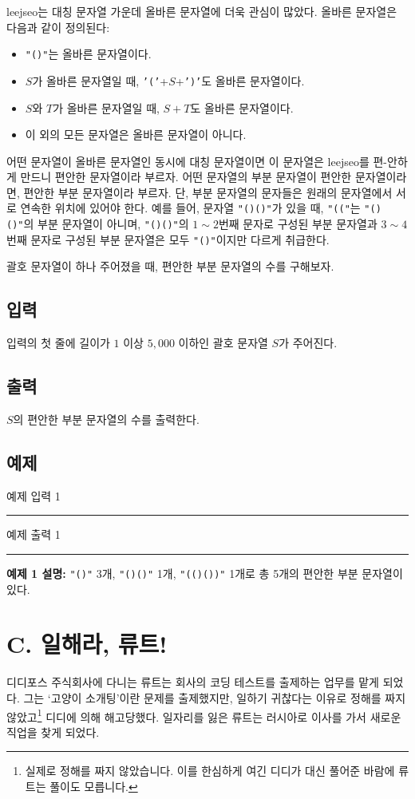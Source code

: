 \documentclass{article}
\def\inputdataname{예제 입력 } %
\def\outputdataname{예제 출력 } %
\newcommand{\iodataNo}[2]{%
	\begin{minipage}{\textwidth}
		\begin{multicols}{2}
			{\inputdataname#2} \\
			\rule{\columnwidth}{1pt}
			
			\columnbreak
			{\outputdataname#2} \\
			\rule{\columnwidth}{1pt}
			
		\end{multicols}
		\vspace{\baselineskip}
	\end{minipage}

}
\begin{document}
leejseo는 대칭 문자열 가운데 올바른 문자열에 더욱 관심이 많았다. 올바른 문자열은 다음과 같이 정의된다:
\begin{itemize}
	\item \texttt{"()"}는 올바른 문자열이다.
	\item $S$가 올바른 문자열일 때, \texttt{'('}+$S$+\texttt{')'}도 올바른 문자열이다.
	\item $S$와 $T$가 올바른 문자열일 때, $S+T$도 올바른 문자열이다.
	\item 이 외의 모든 문자열은 올바른 문자열이 아니다.
\end{itemize}

어떤 문자열이 올바른 문자열인 동시에 대칭 문자열이면 이 문자열은 leejseo를 편-안하게 만드니 편안한 문자열이라 부르자. 어떤 문자열의 부분 문자열이 편안한 문자열이라면, 편안한 부분 문자열이라 부르자. 단, 부분 문자열의 문자들은 원래의 문자열에서 서로 연속한 위치에 있어야 한다. 예를 들어, 문자열 \texttt{"()()"}가 있을 때, \texttt{"(("}는 \texttt{"()()"}의 부분 문자열이 아니며, \texttt{"()()"}의 $1\sim2$번째 문자로 구성된 부분 문자열과 $3\sim4$번째 문자로 구성된 부분 문자열은 모두 \texttt{"()"}이지만 다르게 취급한다.\newline

괄호 문자열이 하나 주어졌을 때, 편안한 부분 문자열의 수를 구해보자.

\subsection{입력}
입력의 첫 줄에 길이가 $1$ 이상 $5,000$ 이하인 괄호 문자열 $S$가 주어진다.

\subsection{출력}
$S$의 편안한 부분 문자열의 수를 출력한다.

\subsection{예제}
\iodataNo{par1}{1}

\textbf{예제 1 설명:} \texttt{"()"} 3개, \texttt{"()()"} 1개, \texttt{"(()())"} 1개로 총 5개의 편안한 부분 문자열이 있다. \newline

\newpage

\section{C. 일해라, 류트!}
디디포스 주식회사에 다니는 류트는 회사의 코딩 테스트를 출제하는 업무를 맡게 되었다. 그는 `고양이 소개팅'이란 문제를 출제했지만, 일하기 귀찮다는 이유로 정해를 짜지 않았고\footnote{실제로 정해를 짜지 않았습니다. 이를 한심하게 여긴 디디가 대신 풀어준 바람에 류트는 풀이도 모릅니다.} 디디에 의해 해고당했다. 일자리를 잃은 류트는 러시아로 이사를 가서 새로운 직업을 찾게 되었다.\newline
\end{document}
